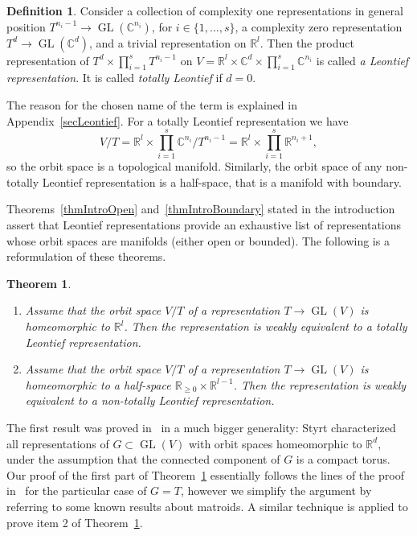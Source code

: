 \documentclass[english,12pt,oneside]{amsproc}
\DeclareMathOperator{\GL}{GL}
\newcommand{\Ro}{\mathbb{R}}
\newcommand{\Rg}{\mathbb{R}_{\geqslant 0}}
\newcommand{\Co}{\mathbb{C}}
\newcounter{stmcounter}[section]
\numberwithin{equation}{section}
\theoremstyle{plain}
\newtheorem{thm}[stmcounter]{Theorem}
\theoremstyle{definition}
\newtheorem{defin}[stmcounter]{Definition}
\theoremstyle{remark}
\begin{document}
\begin{defin}\label{definLeontRepres}
Consider a collection of complexity one representations in general position $T^{n_i-1}\to\GL(\Co^{n_i})$, for $i\in\{1,\ldots,s\}$, a complexity zero representation $T^d\to\GL(\Co^d)$, and a trivial representation on $\Ro^l$. Then the product representation of $T^d\times\prod_{i=1}^{s}T^{n_i-1}$ on $V=\Ro^l\times\Co^d\times\prod_{i=1}^{s}\Co^{n_i}$ is called \emph{a Leontief representation}. It is called \emph{totally Leontief} if $d=0$.
\end{defin}

The reason for the chosen name of the term is explained in Appendix~\ref{secLeontief}. For a totally Leontief representation we have
\[
V/T=\Ro^l\times\prod_{i=1}^{s}\Co^{n_i}/T^{n_i-1}=\Ro^l\times\prod_{i=1}^{s}\Ro^{n_i+1},
\]
so the orbit space is a topological manifold. %
Similarly, the orbit space of any non-totally Leontief representation is a half-space, that is a manifold with boundary.

Theorems~\ref{thmIntroOpen} and~\ref{thmIntroBoundary} stated in the introduction assert that Leontief representations provide an exhaustive list of representations whose orbit spaces are manifolds (either open or bounded). The following is a reformulation of these theorems.

\begin{thm}\label{thmAll}\mbox{}
\begin{enumerate}
  \item Assume that the orbit space $V/T$ of a representation $T\to\GL(V)$ is homeomorphic to $\Ro^l$. Then the representation is weakly equivalent to a totally Leontief representation.
  \item Assume that the orbit space $V/T$ of a representation $T\to\GL(V)$ is homeomorphic to a half-space $\Rg\times\Ro^{l-1}$. Then the representation is weakly equivalent to a non-totally Leontief representation.
\end{enumerate}
\end{thm}

The first result was proved in~\cite[Thm.1.3]{Styrt} in a much bigger generality: Styrt characterized all representations of $G\subset \GL(V)$ with orbit spaces homeomorphic to $\Ro^d$, under the assumption that the connected component of $G$ is a compact torus. Our proof of the first part of Theorem~\ref{thmAll} essentially follows the lines of the proof in~\cite{Styrt} for the particular case of $G=T$, however we simplify the argument by referring to some known results about matroids. A similar technique is applied to prove item 2 of Theorem~\ref{thmAll}.
\end{document}
